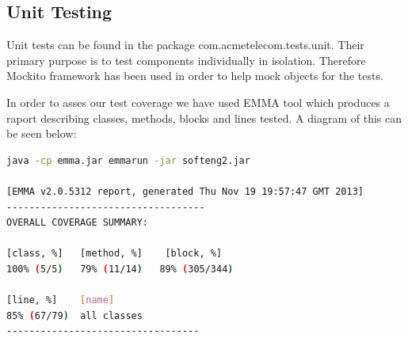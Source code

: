 \documentclass[11pt,twocolumn]{article} %
\begin{document}
\subsection{Unit Testing}
Unit tests can be found in the package com.acmetelecom.tests.unit. Their primary purpose is to test components individually in isolation. Therefore Mockito\cite{mockito} framework has been used in order to help mock objects for the tests.

In order to asses our test coverage we have used EMMA tool which produces a raport describing classes, methods, blocks and lines tested. A diagram of this can be seen below:

\begin{lstlisting}[language=bash]
java -cp emma.jar emmarun -jar softeng2.jar

[EMMA v2.0.5312 report, generated Thu Nov 19 19:57:47 GMT 2013]
-----------------------------------
OVERALL COVERAGE SUMMARY:

[class, %]   [method, %]    [block, %]   
100% (5/5)   79% (11/14)   89% (305/344) 

[line, %]    [name]
85% (67/79)  all classes
----------------------------------
\end{lstlisting}
\end{document}
